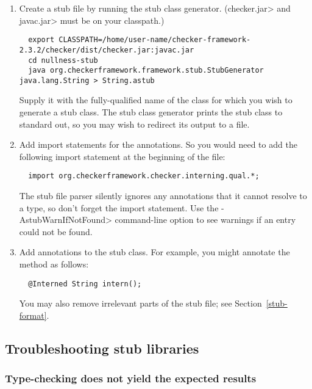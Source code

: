 \begin{enumerate}

\item
  Create a stub file by running the stub class generator.  (\<checker.jar> and \<javac.jar>
  must be on your classpath.)

\begin{Verbatim}
  export CLASSPATH=/home/user-name/checker-framework-2.3.2/checker/dist/checker.jar:javac.jar
  cd nullness-stub
  java org.checkerframework.framework.stub.StubGenerator java.lang.String > String.astub
\end{Verbatim}

  Supply it with the fully-qualified name of the class for which you wish to
  generate a stub class.  The stub class generator prints the
  stub class to standard out, so you may wish to redirect its output to a
  file.

\item
  Add import statements for the annotations.  So you would need to
add the following import statement at the beginning of the file:

\begin{Verbatim}
  import org.checkerframework.checker.interning.qual.*;
\end{Verbatim}

\noindent
The stub file parser silently ignores any annotations that it cannot
resolve to a type, so don't forget the import statement.
Use the \<-AstubWarnIfNotFound> command-line option to see warnings
if an entry could not be found.

\item
  Add annotations to the stub class.  For example, you might annotate
  the  method as follows:

\begin{Verbatim}
  @Interned String intern();
\end{Verbatim}

  You may also remove irrelevant parts of the stub file; see
  Section~\ref{stub-format}.

\end{enumerate}


\subsection{Troubleshooting stub libraries\label{stub-troubleshooting}}


\subsubsection{Type-checking does not yield the expected results\label{stub-troubleshooting-type-checking-results}}

